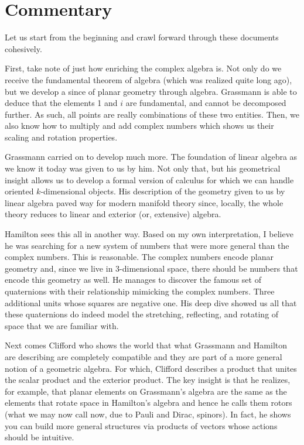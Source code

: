 \documentclass[12pt]{article}
\begin{document}
\newpage
\section{Commentary}

Let us start from the beginning and crawl forward through these documents cohesively. 

First, take note of just how enriching the complex algebra is. Not only do we receive the fundamental theorem of algebra (which was realized quite long ago), but we develop a since of planar geometry through algebra. Grassmann is able to deduce that the elements 1 and $i$ are fundamental, and cannot be decomposed further. As such, all points are really combinations of these two entities. Then, we also know how to multiply and add complex numbers which shows us their scaling and rotation properties.

Grassmann carried on to develop much more. The foundation of linear algebra as we know it today was given to us by him. Not only that, but his geometrical insight allows us to develop a formal version of calculus for which we can handle oriented $k$-dimensional objects. His description of the geometry given to us by linear algebra paved way for modern manifold theory since, locally, the whole theory reduces to linear and exterior (or, extensive) algebra.

Hamilton sees this all in another way. Based on my own interpretation, I believe he was searching for a new system of numbers that were more general than the complex numbers. This is reasonable. The complex numbers encode planar geometry and, since we live in 3-dimensional space, there should be numbers that encode this geometry as well. He manages to discover the famous set of quaternions with their relationship mimicking the complex numbers. Three additional units whose squares are negative one. His deep dive showed us all that these quaternions do indeed model the stretching, reflecting, and rotating of space that we are familiar with.

Next comes Clifford who shows the world that what Grassmann and Hamilton are describing are completely compatible and they are part of a more general notion of a geometric algebra. For which, Clifford describes a product that unites the scalar product and the exterior product. The key insight is that he realizes, for example, that planar elements on Grassmann's algebra are the same as the elements that rotate space in Hamilton's algebra and hence he calls them rotors (what we may now call now, due to Pauli and Dirac, spinors). In fact, he shows you can build more general structures via products of vectors whose actions should be intuitive.
\end{document}
